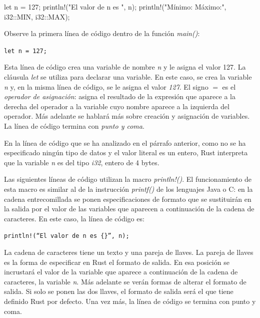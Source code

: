\vspace{0.7em}
\begin{Codigo}
let n = 127;
println!("El valor de n es {}", n);
println!("Mínimo:{} Máximo:{}", i32::MIN, i32::MAX);
\end{Codigo}

Observe la primera línea de código dentro de la función \textit{main()}:

{\centering \texttt{let n = 127;} \par}

Esta línea de código crea una variable de nombre \textit{n} y le asigna el valor 127. La cláusula \textit{let} se utiliza para declarar una variable. En este caso, se crea la variable \textit{n} y, en la misma línea de código, se le asigna el valor \textit{127}. El signo $=$ es el \textit{operador de asignación}: asigna el resultado de la expresión que aparece a la derecha del operador a la variable cuyo nombre aparece a la izquierda del operador. Más adelante se hablará más sobre creación y asignación de variables. La línea de código termina con \textit{punto y coma}.

En la línea de código que se ha analizado en el párrafo anterior, como no se ha especificado ningún tipo de datos y el valor literal es un entero, Rust interpreta que la variable \textit{n} es del tipo \textit{i32}, entero de 4 bytes.

Las siguientes líneas de código utilizan la macro \textit{println!()}. El funcionamiento de esta macro es similar al de la instrucción \textit{printf()} de los lenguajes Java o C: en la cadena entrecomillada se ponen especificaciones de formato que se sustituirán en la salida por el valor de las variables que aparecen a continuación de la cadena de caracteres. En este caso, la línea de código es:

{\centering \texttt{println!(``El valor de n es \{\}'', n);} \par}

La cadena de caracteres tiene un texto y una pareja de llaves. La pareja de llaves es la forma de especificar en Rust el formato de salida. En esa posición se incrustará el valor de la variable que aparece a continuación de la cadena de caracteres, la variable \textit{n}. Más adelante se verán formas de alterar el formato de salida. Si solo se ponen las dos llaves, el formato de salida será el que tiene definido Rust por defecto. Una vez más, la línea de código se termina con punto y coma.
\vspace{1em}

